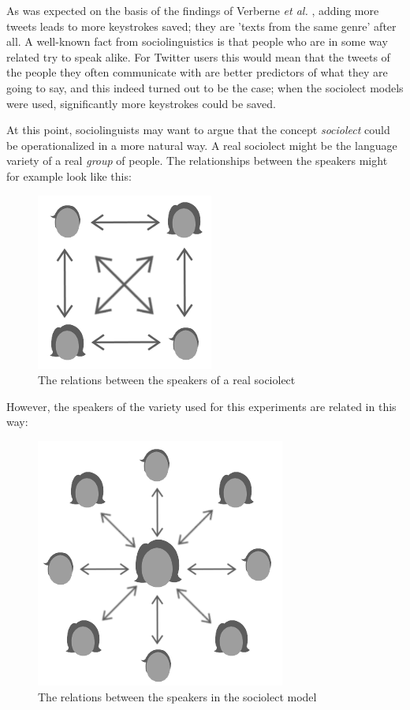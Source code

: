 \documentclass[11pt]{article}
\begin{document}
As was expected on the basis of the findings of Verberne {\em et al.} , adding more tweets leads to more keystrokes saved; they are 'texts from the same genre' after all. A well-known fact from sociolinguistics is that people who are in some way related try to speak alike. For Twitter users this would mean that the tweets of the people they often communicate with are better predictors of what they are going to say, and this indeed turned out to be the case; when the sociolect models were used, significantly more keystrokes could be saved.

At this point, sociolinguists may want to argue that the concept \emph{sociolect} could be operationalized in a more natural way. A real sociolect might be the language variety of a real \emph{group} of people. The relationships between the speakers might for example look like this:

\begin{figure}[H] \centering
\includegraphics[scale=0.75]{real_network}
\caption{The relations between the speakers of a real sociolect}
\end{figure} 

However, the speakers of the variety used for this experiments are related in this way:

\begin{figure}[H] \centering
\includegraphics[scale=0.75]{sloppy_network}
\caption{The relations between the speakers in the sociolect model}
\end{figure} 
\end{document}
